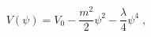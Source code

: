 \begin{equation}
V(\psi) = V_0 -\frac{m^2}{2} \psi^2 - \frac{\lambda}{4} \psi^4 \;,
\end{equation}

